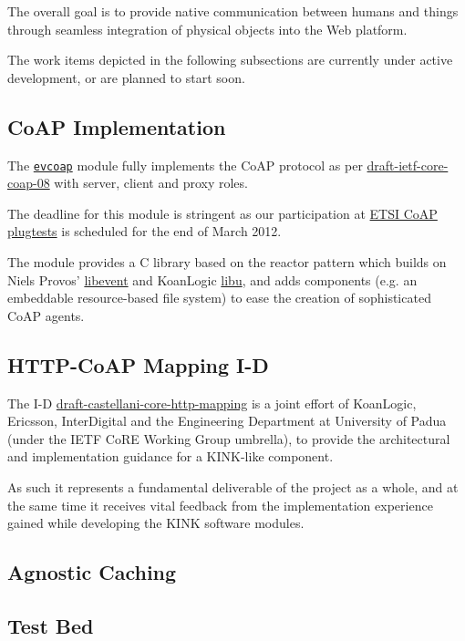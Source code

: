 \documentclass[12pt]{article}
\newcommand{\swmod}[1]{\mbox{\texttt{#1}}}
\begin{document}
The overall goal is to provide native communication between humans and things through seamless integration of physical objects into the Web platform.

The work items depicted in the following subsections are currently under active development, or are planned to start soon.

\subsection{CoAP Implementation}
The \href{https://github.com/koanlogic/webthings/tree/master/bits/evcoap}{\swmod{evcoap}} module fully implements the CoAP protocol as per \href{http://tools.ietf.org/html/draft-ietf-core-coap}{draft-ietf-core-coap-08} with server, client and proxy roles.

The deadline for this module is stringent as our participation at \href{http://www.etsi.org/plugtests/coap/coap.htm}{ETSI CoAP plugtests} is scheduled for the end of March 2012.

The module provides a C library based on the reactor pattern which builds on Niels Provos' \href{http://libevent.org}{libevent} and KoanLogic \href{http://koanlogic.com/libu}{libu}, and adds components (e.g. an embeddable resource-based file system) to ease the creation of sophisticated CoAP agents.

\subsection{HTTP-CoAP Mapping I-D}
The I-D \href{http://tools.ietf.org/html/draft-castellani-core-http-mapping}{draft-castellani-core-http-mapping} is a joint effort of \mbox{KoanLogic}, \mbox{Ericsson}, \mbox{InterDigital} and the Engineering Department at University of Padua (under the IETF CoRE Working Group umbrella), to provide the architectural and implementation guidance for a KINK-like component.

As such it represents a fundamental deliverable of the project as a whole, and at the same time it receives vital feedback from the implementation experience gained while developing the KINK software modules.

\subsection{Agnostic Caching}


\subsection{Test Bed}

\end{document}
